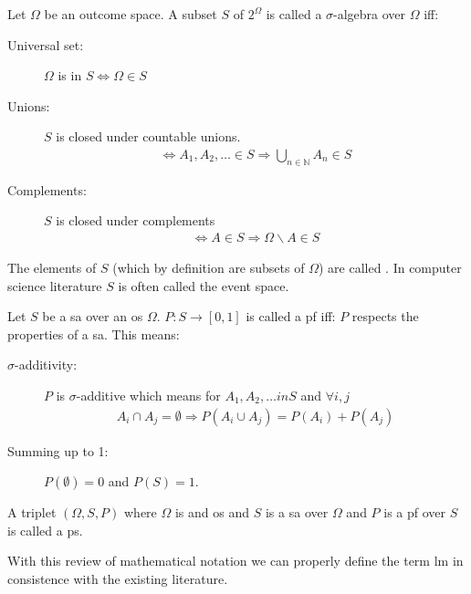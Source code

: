 \documentclass[•]{book}
\begin{document}
\begin{definition}\label{def:sa}
Let $\Omega$ be an outcome space. 
A subset $S$ of $2^\Omega$ is called a $\sigma$-algebra over $\Omega$ iff:

\begin{description}
\item[Universal set:] $\Omega$ is in $S \Leftrightarrow \Omega \in S$
\item[Unions:] $S$ is closed under countable unions. 
\begin{align}
 \Leftrightarrow A_1,A_2,\dots \in S \Rightarrow \bigcup_{n\in\mathbb{N}}A_n \in S \label{eq:closedUnion}
\end{align}
\item[Complements:] $S$ is closed under complements
\begin{align}
\Leftrightarrow  A\in S \Rightarrow \Omega\backslash A \in S 
\end{align}
\end{description}
The elements of $S$ (which by definition are subsets of $\Omega$) are called .
In computer science literature $S$ is often called the event space.
\end{definition}


\begin{definition}\label{def:pf}
Let $S$ be a \gls{sa} over an \gls{os} $\Omega$. $P:S\longrightarrow [0,1]$ is called a \gls{pf} iff: 
$P$ respects the properties of a \gls{sa}. This means: 
\begin{description}
\item [$\sigma$-additivity:] $P$ is $\sigma$-additive which means for $A_1,A_2,\dots in S$ and $\forall i,j$
\begin{align}
A_i\cap A_j = \emptyset \Rightarrow P(A_i\cup A_j) = P(A_i)+P(A_j)
\end{align}
\item[Summing up to 1:] $P(\emptyset)=0$ and $P(S)=1$. 
\end{description}
\end{definition}

\begin{definition}\label{def:ps}
A triplet $(\Omega,S,P)$ where $\Omega$ is and \gls{os} and $S$ is a \gls{sa} over $\Omega$ and $P$ is a \gls{pf} over $S$ is called a \gls{ps}.  
\end{definition}

With this review of mathematical notation we can properly define the term \gls{lm} in consistence with the existing literature.
\end{document}
